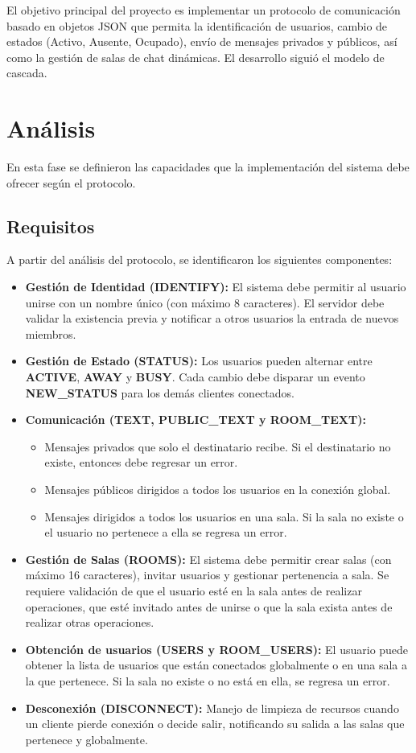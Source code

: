 \documentclass[12pt,a4paper]{article}
\begin{document}
El objetivo principal del proyecto es implementar un protocolo de comunicación basado en objetos JSON que permita la identificación de usuarios, cambio de estados (Activo, Ausente, Ocupado), envío de mensajes privados y públicos, así como la gestión de salas de chat dinámicas. 
El desarrollo siguió el modelo de cascada.

\section{Análisis}
En esta fase se definieron las capacidades que la implementación del sistema debe ofrecer según el protocolo.

\subsection{Requisitos}
A partir del análisis del protocolo, se identificaron los siguientes componentes:

\begin{itemize}
  \item \textbf{Gestión de Identidad (IDENTIFY):} El sistema debe permitir al usuario unirse con un nombre único (con máximo 8 caracteres). El servidor debe validar la existencia previa y notificar a otros usuarios la entrada de nuevos miembros.
  \item \textbf{Gestión de Estado (STATUS):} Los usuarios pueden alternar entre \textbf{ACTIVE}, \textbf{AWAY} y \textbf{BUSY}. Cada cambio debe disparar un evento \textbf{NEW\_STATUS} para los demás clientes conectados.
  \item \textbf{Comunicación (TEXT, PUBLIC\_TEXT y ROOM\_TEXT):} 
        \begin{itemize}
          \item Mensajes privados que solo el destinatario recibe. Si el destinatario no existe, entonces debe regresar un error.
          \item Mensajes públicos dirigidos a todos los usuarios en la conexión global.
          \item Mensajes dirigidos a todos los usuarios en una sala. Si la sala no existe o el usuario no pertenece a ella se regresa un error.
        \end{itemize}
  \item \textbf{Gestión de Salas (ROOMS):} El sistema debe permitir crear salas (con máximo 16 caracteres), invitar usuarios y gestionar pertenencia a sala. Se requiere validación de que el usuario esté en la sala antes de realizar operaciones, que esté invitado antes de unirse o que la sala exista antes de realizar otras operaciones.
  \item \textbf{Obtención de usuarios (USERS y ROOM\_USERS):} El usuario puede obtener la lista de usuarios que están conectados globalmente o en una sala a la que pertenece. Si la sala no existe o no está en ella, se regresa un error.
  \item \textbf{Desconexión (DISCONNECT):} Manejo de limpieza de recursos cuando un cliente pierde conexión o decide salir, notificando su salida a las salas que pertenece y globalmente.
\end{itemize}
\end{document}
